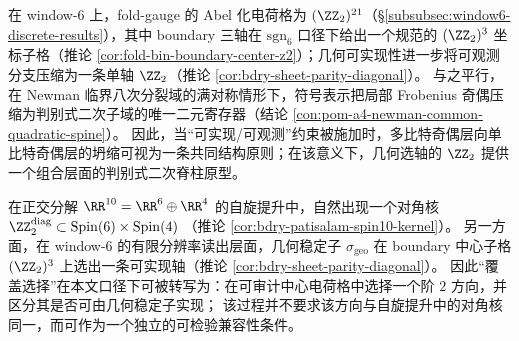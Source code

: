 \begin{remark}[从组合奇偶到判别式奇偶的单比特压缩]\label{rem:bdry-parity-compression-to-discriminant-spine}
在 window-\(6\) 上，fold-gauge 的 Abel 化电荷格为 \((\ZZ_2)^{21}\)（\S\ref{subsubsec:window6-discrete-results}），其中 boundary 三轴在 \(\mathrm{sgn}_6\) 口径下给出一个规范的 \((\ZZ_2)^3\) 坐标子格（推论 \ref{cor:fold-bin-boundary-center-z2}）；几何可实现性进一步将可观测分支压缩为一条单轴 \(\ZZ_2\)（推论 \ref{cor:bdry-sheet-parity-diagonal}）。
与之平行，在 Newman 临界八次分裂域的满对称情形下，符号表示把局部 Frobenius 奇偶压缩为判别式二次子域的唯一二元寄存器（结论 \ref{con:pom-a4-newman-common-quadratic-spine}）。
因此，当“可实现/可观测”约束被施加时，多比特奇偶层向单比特奇偶层的坍缩可视为一条共同结构原则；在该意义下，几何选轴的 \(\ZZ_2\) 提供一个组合层面的判别式二次脊柱原型。
\end{remark}

\begin{remark}\label{rem:bdry-diagonal-z2-spin-cover}
在正交分解 \(\RR^{10}=\RR^6\oplus\RR^4\) 的自旋提升中，自然出现一个对角核
\(\ZZ_2^{\mathrm{diag}}\subset \mathrm{Spin}(6)\times \mathrm{Spin}(4)\)
（推论 \ref{cor:bdry-patisalam-spin10-kernel}）。
另一方面，在 window-\(6\) 的有限分辨率读出层面，几何稳定子 \(\sigma_{\mathrm{geo}}\) 在 boundary 中心子格 \((\ZZ_2)^3\) 上选出一条可实现轴（推论 \ref{cor:bdry-sheet-parity-diagonal}）。
因此“覆盖选择”在本文口径下可被转写为：在可审计中心电荷格中选择一个阶 \(2\) 方向，并区分其是否可由几何稳定子实现；
该过程并不要求该方向与自旋提升中的对角核同一，而可作为一个独立的可检验兼容性条件。
\end{remark}

